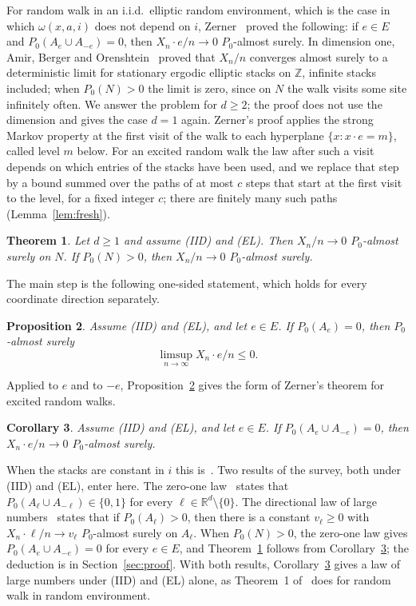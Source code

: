 \documentclass[11pt]{amsart}
\newtheorem{theorem}{Theorem}[section]
\newtheorem{proposition}[theorem]{Proposition}
\newtheorem{corollary}[theorem]{Corollary}
\theoremstyle{remark}
\newcommand{\Z}{\mathbb{Z}}
\newcommand{\R}{\mathbb{R}}
\begin{document}
\medskip
For random walk in an i.i.d.\ elliptic random environment, which is the case in which $\omega(x,a,i)$ does not depend
on $i$, Zerner~\cite[Theorem 1]{Zer02} proved the following: if $e\in E$ and $P_0(A_e\cup A_{-e})=0$, then
$X_n\cdot e/n\to0$ $P_0$-almost surely. In dimension one, Amir, Berger and Orenshtein~\cite[Theorem 1.3]{ABO16} proved
that $X_n/n$ converges almost surely to a deterministic limit for stationary ergodic elliptic stacks on $\Z$, infinite
stacks included; when $P_0(N)>0$ the limit is zero, since on $N$ the walk visits some site infinitely often. We answer
the problem for $d\ge2$; the proof does not use the dimension and gives the case $d=1$ again. Zerner's proof applies
the strong Markov property at the first visit of the walk to each hyperplane $\{x:x\cdot e=m\}$, called level $m$
below. For an excited random walk the law after such a visit depends on which entries of the stacks have been used,
and we replace that step by a bound summed over the paths of at most $c$ steps that start at the first visit to the
level, for a fixed integer $c$; there are finitely many such paths (Lemma~\ref{lem:fresh}).

\begin{theorem}\label{thm:main}
Let $d\ge1$ and assume (IID) and (EL). Then $X_n/n\to0$ $P_0$-almost surely on $N$. If $P_0(N)>0$, then $X_n/n\to0$
$P_0$-almost surely.
\end{theorem}

The main step is the following one-sided statement, which holds for every coordinate direction separately.

\begin{proposition}\label{prop:onesided}
Assume (IID) and (EL), and let $e\in E$. If $P_0(A_e)=0$, then $P_0$-almost surely
\[
\limsup_{n\to\infty}X_n\cdot e/n\le0 .
\]
\end{proposition}

Applied to $e$ and to $-e$, Proposition~\ref{prop:onesided} gives the form of Zerner's theorem for excited random walks.

\begin{corollary}\label{cor:zerner}
Assume (IID) and (EL), and let $e\in E$. If $P_0(A_e\cup A_{-e})=0$, then $X_n\cdot e/n\to0$ $P_0$-almost surely.
\end{corollary}

When the stacks are constant in $i$ this is~\cite[Theorem 1]{Zer02}. Two results of the survey, both under (IID) and
(EL), enter here. The zero-one law~\cite[Theorem 3.16]{KZ13} states that $P_0(A_\ell\cup A_{-\ell})\in\{0,1\}$ for every
$\ell\in\R^d\setminus\{0\}$. The directional law of large numbers~\cite[Theorem 4.6]{KZ13} states that if
$P_0(A_\ell)>0$, then there is a constant $v_\ell\ge0$ with $X_n\cdot\ell/n\to v_\ell$ $P_0$-almost surely on $A_\ell$.
When $P_0(N)>0$, the zero-one law gives $P_0(A_e\cup A_{-e})=0$ for every $e\in E$, and Theorem~\ref{thm:main} follows
from Corollary~\ref{cor:zerner}; the deduction is in Section~\ref{sec:proof}. With both results,
Corollary~\ref{cor:zerner} gives a law of large numbers under (IID) and (EL) alone, as Theorem~1 of~\cite{Zer02} does
for random walk in random environment.
\end{document}
